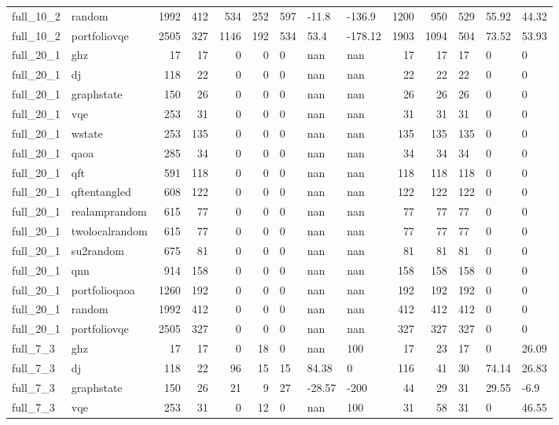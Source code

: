 \begin{longtable}{llrrrrlllrrlll}
full\_10\_2 & random & 1992 & 412 & 534 & 252 & 597 & -11.8 & -136.9 & 1200 & 950 & 529 & 55.92 & 44.32 \\
full\_10\_2 & portfoliovqe & 2505 & 327 & 1146 & 192 & 534 & 53.4 & -178.12 & 1903 & 1094 & 504 & 73.52 & 53.93 \\
full\_20\_1 & ghz & 17 & 17 & 0 & 0 & 0 & nan & nan & 17 & 17 & 17 & 0 & 0 \\
full\_20\_1 & dj & 118 & 22 & 0 & 0 & 0 & nan & nan & 22 & 22 & 22 & 0 & 0 \\
full\_20\_1 & graphstate & 150 & 26 & 0 & 0 & 0 & nan & nan & 26 & 26 & 26 & 0 & 0 \\
full\_20\_1 & vqe & 253 & 31 & 0 & 0 & 0 & nan & nan & 31 & 31 & 31 & 0 & 0 \\
full\_20\_1 & wstate & 253 & 135 & 0 & 0 & 0 & nan & nan & 135 & 135 & 135 & 0 & 0 \\
full\_20\_1 & qaoa & 285 & 34 & 0 & 0 & 0 & nan & nan & 34 & 34 & 34 & 0 & 0 \\
full\_20\_1 & qft & 591 & 118 & 0 & 0 & 0 & nan & nan & 118 & 118 & 118 & 0 & 0 \\
full\_20\_1 & qftentangled & 608 & 122 & 0 & 0 & 0 & nan & nan & 122 & 122 & 122 & 0 & 0 \\
full\_20\_1 & realamprandom & 615 & 77 & 0 & 0 & 0 & nan & nan & 77 & 77 & 77 & 0 & 0 \\
full\_20\_1 & twolocalrandom & 615 & 77 & 0 & 0 & 0 & nan & nan & 77 & 77 & 77 & 0 & 0 \\
full\_20\_1 & su2random & 675 & 81 & 0 & 0 & 0 & nan & nan & 81 & 81 & 81 & 0 & 0 \\
full\_20\_1 & qnn & 914 & 158 & 0 & 0 & 0 & nan & nan & 158 & 158 & 158 & 0 & 0 \\
full\_20\_1 & portfolioqaoa & 1260 & 192 & 0 & 0 & 0 & nan & nan & 192 & 192 & 192 & 0 & 0 \\
full\_20\_1 & random & 1992 & 412 & 0 & 0 & 0 & nan & nan & 412 & 412 & 412 & 0 & 0 \\
full\_20\_1 & portfoliovqe & 2505 & 327 & 0 & 0 & 0 & nan & nan & 327 & 327 & 327 & 0 & 0 \\
full\_7\_3 & ghz & 17 & 17 & 0 & 18 & 0 & nan & 100 & 17 & 23 & 17 & 0 & 26.09 \\
full\_7\_3 & dj & 118 & 22 & 96 & 15 & 15 & 84.38 & 0 & 116 & 41 & 30 & 74.14 & 26.83 \\
full\_7\_3 & graphstate & 150 & 26 & 21 & 9 & 27 & -28.57 & -200 & 44 & 29 & 31 & 29.55 & -6.9 \\
full\_7\_3 & vqe & 253 & 31 & 0 & 12 & 0 & nan & 100 & 31 & 58 & 31 & 0 & 46.55 \\

\end{longtable}
